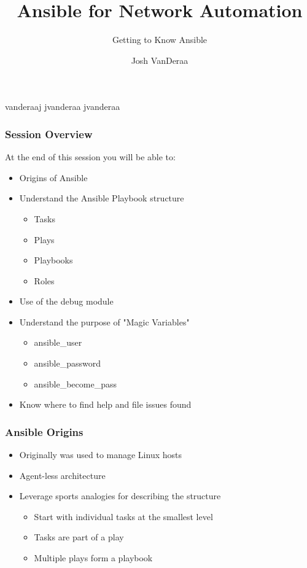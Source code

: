 \documentclass{beamer}
\title{Ansible for Network Automation}
\subtitle{Getting to Know Ansible}
\date{}
\author{Josh VanDeraa}
\begin{document}
\begin{frame}
  \maketitle
  \footnotesize
  \faTwitter vanderaaj \hfill \faGithub jvanderaa \hfill \faSlack jvanderaa
\end{frame}

\begin{frame}
  \frametitle{Session Overview}
  At the end of this session you will be able to:
  \begin{itemize}
    \item <2-> Origins of Ansible
    \item <3-> Understand the Ansible Playbook structure
    \begin{itemize}
      \item <3-> Tasks
      \item <4-> Plays
      \item <5-> Playbooks
      \item <6-> Roles
    \end{itemize}
    \item <7-> Use of the debug module
    \item <8-> Understand the purpose of "Magic Variables"
    \begin{itemize}
      \item <8-> ansible\_user
      \item <9-> ansible\_password
      \item <10-> ansible\_become\_pass
    \end{itemize}
    \item <11-> Know where to find help and file issues found
  \end{itemize}
\end{frame}

\begin{frame}
  \frametitle{Ansible Origins}
  \begin{itemize}
    \item Originally was used to manage Linux hosts
    \item <2-> Agent-less architecture
    \item <3-> Leverage sports analogies for describing the structure
    \begin{itemize}
      \item <3-> Start with individual tasks at the smallest level
      \item <4-> Tasks are part of a play
      \item <5-> Multiple plays form a playbook
    \end{itemize}
  \end{itemize}
\end{frame}
\end{document}
